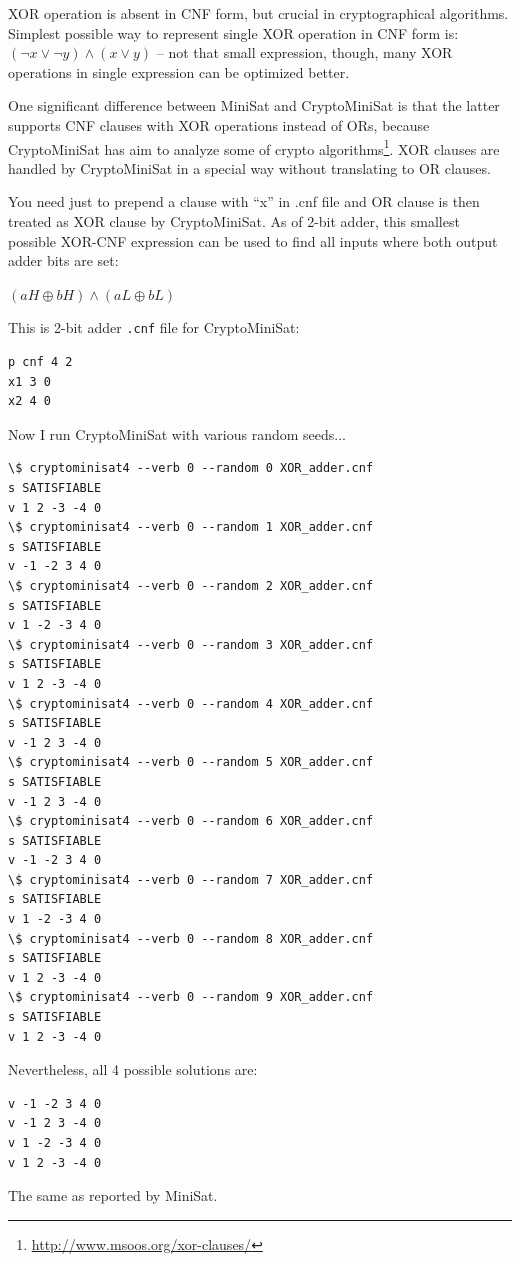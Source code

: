 XOR operation is absent in CNF form, but crucial in cryptographical algorithms.
Simplest possible way to represent single XOR operation in CNF form is: $(\neg x \vee \neg y) \wedge (x \vee y)$ -- not that small expression, 
though, many XOR operations in single expression can be optimized better.

One significant difference between MiniSat and CryptoMiniSat is that the latter supports CNF clauses with XOR operations instead of ORs,
because CryptoMiniSat has aim to analyze some of crypto algorithms\footnote{\url{http://www.msoos.org/xor-clauses/}}.
XOR clauses are handled by CryptoMiniSat in a special way without translating to OR clauses.

You need just to prepend a clause with ``x'' in .cnf file and OR clause is then treated as XOR clause by CryptoMiniSat.
As of 2-bit adder, this smallest possible XOR-CNF expression can be used to find all inputs where both output adder bits are set:

$(aH \oplus bH) \wedge (aL \oplus bL)$

This is 2-bit adder \texttt{.cnf} file for CryptoMiniSat:

\begin{lstlisting}
p cnf 4 2
x1 3 0
x2 4 0
\end{lstlisting}

Now I run CryptoMiniSat with various random seeds...

\begin{lstlisting}
\$ cryptominisat4 --verb 0 --random 0 XOR_adder.cnf
s SATISFIABLE
v 1 2 -3 -4 0
\$ cryptominisat4 --verb 0 --random 1 XOR_adder.cnf
s SATISFIABLE
v -1 -2 3 4 0
\$ cryptominisat4 --verb 0 --random 2 XOR_adder.cnf
s SATISFIABLE
v 1 -2 -3 4 0
\$ cryptominisat4 --verb 0 --random 3 XOR_adder.cnf
s SATISFIABLE
v 1 2 -3 -4 0
\$ cryptominisat4 --verb 0 --random 4 XOR_adder.cnf
s SATISFIABLE
v -1 2 3 -4 0
\$ cryptominisat4 --verb 0 --random 5 XOR_adder.cnf
s SATISFIABLE
v -1 2 3 -4 0
\$ cryptominisat4 --verb 0 --random 6 XOR_adder.cnf
s SATISFIABLE
v -1 -2 3 4 0
\$ cryptominisat4 --verb 0 --random 7 XOR_adder.cnf
s SATISFIABLE
v 1 -2 -3 4 0
\$ cryptominisat4 --verb 0 --random 8 XOR_adder.cnf
s SATISFIABLE
v 1 2 -3 -4 0
\$ cryptominisat4 --verb 0 --random 9 XOR_adder.cnf
s SATISFIABLE
v 1 2 -3 -4 0
\end{lstlisting}

Nevertheless, all 4 possible solutions are:

\begin{lstlisting}
v -1 -2 3 4 0
v -1 2 3 -4 0
v 1 -2 -3 4 0
v 1 2 -3 -4 0
\end{lstlisting}

The same as reported by MiniSat.

